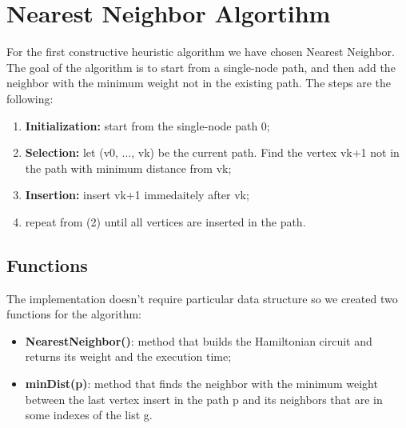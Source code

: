 \section{Nearest Neighbor Algortihm}\label{nearest}
For the first constructive heuristic algorithm we have chosen Nearest Neighbor. The goal of the algorithm is to start from a single-node path, and then add the neighbor with the minimum weight not in the existing path. The steps are the following:\\

\begin{enumerate}
	\item  \textbf{Initialization:} start from the single-node path 0;
	\item  \textbf{Selection:} let (v0, ..., vk) be the current path. Find the vertex vk+1 not in the path with minimum distance from vk;
	\item  \textbf{Insertion:} insert vk+1 immedaitely after vk;
	\item repeat from (2) until all vertices are inserted in the path.
\end{enumerate}  


\subsection{Functions}
The implementation doesn't require particular data structure so we created two functions for the algorithm:
\begin{itemize}
	\item  \textbf{NearestNeighbor()}: method that builds the Hamiltonian circuit and returns its weight and the execution time;
	\item  \textbf{minDist(p)}: method that finds the neighbor with the minimum weight between the last vertex insert in the path p and its neighbors that are in some indexes of the list g.
\end{itemize}


